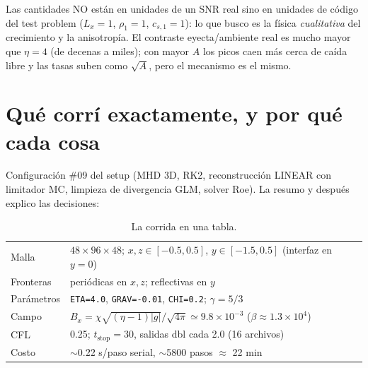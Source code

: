 \documentclass[11pt,a4paper]{article}
\begin{document}
Las cantidades NO están en unidades de un SNR real sino en unidades de código del test
problem ($L_x=1$, $\rho_1=1$, $c_{s,1}=1$): lo que busco es la física \emph{cualitativa}
del crecimiento y la anisotropía. El contraste eyecta/ambiente real es mucho mayor que
$\eta=4$ (de decenas a miles); con mayor $A$ los picos caen más cerca de caída libre y
las tasas suben como $\sqrt{A}$, pero el mecanismo es el mismo.

\section{Qué corrí exactamente, y por qué cada cosa}

Configuración \#09 del setup (MHD 3D, RK2, reconstrucción LINEAR con limitador MC,
limpieza de divergencia GLM, solver Roe). La resumo y después explico las decisiones:

\begin{table}[H]
\centering\small
\caption{La corrida en una tabla.}
\begin{tabular}{@{}p{2.5cm}p{12.9cm}@{}}
\toprule
Malla & $48\times96\times48$; $x,z\in[-0.5,0.5]$, $y\in[-1.5,0.5]$ (interfaz en $y=0$) \\
Fronteras & periódicas en $x,z$; reflectivas en $y$ \\
Parámetros & \texttt{ETA=4.0}, \texttt{GRAV=-0.01}, \texttt{CHI=0.2}; $\gamma=5/3$ \\
Campo & $B_x=\chi\sqrt{(\eta-1)|g|}/\sqrt{4\pi}\simeq 9.8\times10^{-3}$ ($\beta\approx1.3\times10^4$) \\
CFL & 0.25; $t_\mathrm{stop}=30$, salidas dbl cada 2.0 (16 archivos) \\
Costo & $\sim$0.22 s/paso serial, $\sim$5800 pasos $\approx$ 22 min \\
\bottomrule
\end{tabular}
\end{table}
\end{document}
